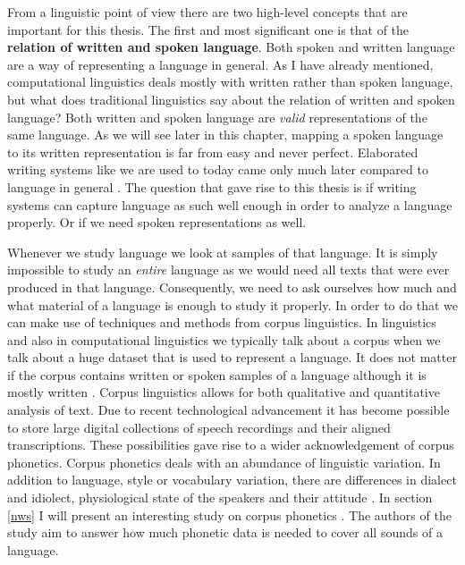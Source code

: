 \label{chap:ling-background}

From a linguistic point of view there are two high-level concepts that are important for this thesis. The first and most significant one is that of the \textbf{relation of written and spoken language}. Both spoken and written language are a way of representing a language in general. As I have already mentioned, computational linguistics deals mostly with written rather than spoken language, but what does traditional linguistics say about the relation of written and spoken language? Both written and spoken language are \textit{valid} representations of the same language. As we will see later in this chapter, mapping a spoken language to its written representation is far from easy and never perfect. Elaborated writing systems like we are used to today came only much later compared to language in general \citep{writing-systems, Hock&Joseph.2019}. The question that gave rise to this thesis is if writing systems can capture language as such well enough in order to analyze a language properly. Or if we need spoken representations as well. 

Whenever we study language we look at samples of that language. It is simply impossible to study an \textit{entire} language as we would need all texts that were ever produced in that language. Consequently, we need to ask ourselves how much and what material of a language is enough to study it properly. In order to do that we can make use of techniques and methods from corpus linguistics. In linguistics and also in computational linguistics we typically talk about a corpus when we talk about a huge dataset that is used to represent a language. It does not matter if the corpus contains written or spoken samples of a language although it is mostly written \citep{McEnery&Hardie.2011}. Corpus linguistics allows for both qualitative and quantitative analysis of text. Due to recent technological advancement it has become possible to store large digital collections of speech recordings and their aligned transcriptions. These possibilities gave rise to a wider acknowledgement of corpus phonetics. Corpus phonetics deals with an abundance of linguistic variation. In addition to language, style or vocabulary variation, there are differences in dialect and idiolect, physiological state of the speakers and their attitude \citep{Liberman.2019, Chodroff.19.07.2019}. In section \ref{nws} I will present an interesting study on corpus phonetics \citep{baird_evans_greenhill_2021}. The authors of the study aim to answer how much phonetic data is needed to cover all sounds of a language.

